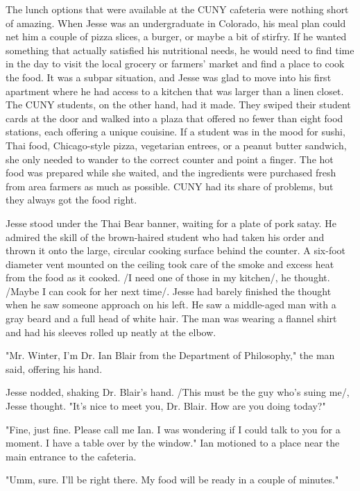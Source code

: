 The lunch options that were available at the CUNY cafeteria were nothing short of amazing.  When Jesse was an undergraduate in Colorado, his meal plan could net him a couple of pizza slices, a burger, or maybe a bit of stirfry.  If he wanted something that actually satisfied his nutritional needs, he would need to find time in the day to visit the local grocery or farmers' market and find a place to cook the food.  It was a subpar situation, and Jesse was glad to move into his first apartment where he had access to a kitchen that was larger than a linen closet.  The CUNY students, on the other hand, had it made.  They swiped their student cards at the door and walked into a plaza that offered no fewer than eight food stations, each offering a unique couisine.  If a student was in the mood for sushi, Thai food, Chicago-style pizza, vegetarian entrees, or a peanut butter sandwich, she only needed to wander to the correct counter and point a finger.  The hot food was prepared while she waited, and the ingredients were purchased fresh from area farmers as much as possible.  CUNY had its share of problems, but they always got the food right.

Jesse stood under the Thai Bear banner, waiting for a plate of pork satay.  He admired the skill of the brown-haired student who had taken his order and thrown it onto the large, circular cooking surface behind the counter.  A six-foot diameter vent mounted on the ceiling took care of the smoke and excess heat from the food as it cooked.  /I need one of those in my kitchen/, he thought.  /Maybe I can cook for her next time/.  Jesse had barely finished the thought when he saw someone approach on his left.  He saw a middle-aged man with a gray beard and a full head of white hair.  The man was wearing a flannel shirt and had his sleeves rolled up neatly at the elbow.

"Mr. Winter, I'm Dr. Ian Blair from the Department of Philosophy," the man said, offering his hand.

Jesse nodded, shaking Dr. Blair's hand.  /This must be the guy who's suing me/, Jesse thought.  "It's nice to meet you, Dr. Blair.  How are you doing today?"

"Fine, just fine.  Please call me Ian.  I was wondering if I could talk to you for a moment.  I have a table over by the window."  Ian motioned to a place near the main entrance to the cafeteria.

"Umm, sure.  I'll be right there.  My food will be ready in a couple of minutes."

